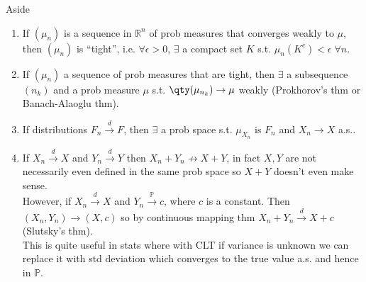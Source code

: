 \begin{aside}{Aside}
	\begin{enumerate}
		\item If $(\mu_n)$ is a sequence in $\mathbb{R}^n$ of prob measures that converges weakly to $\mu$, then $(\mu_n)$ is ``tight'', i.e. $\forall \epsilon > 0$, $\exists$ a compact set $K$ s.t. $\mu_n(K^c) < \epsilon \; \forall n$.
		\item If $(\mu_n)$ a sequence of prob measures that are tight, then $\exists$ a subsequence $(n_k)$ and a prob measure $\mu$ s.t. $\qty(\mu_{n_k}) \to \mu$ weakly (Prokhorov's  thm or Banach-Alaoglu thm).
		\item If distributions $F_n \xrightarrow{d} F$, then $\exists$ a prob space s.t. $\mu_{X_n}$ is $F_n$ and $X_n \to X$ a.s..
		\item If $X_n \xrightarrow{d} X$ and $Y_n \xrightarrow{d} Y$ then $X_n + Y_n \not\to X + Y$, in fact $X, Y$ are not necessarily even defined in the same prob space so $X + Y$ doesn't even make sense. \\
		However, if $X_n \xrightarrow{d} X$ and $Y_n \xrightarrow{\mathbb{P}} c$, where $c$ is a constant.
		Then $(X_n, Y_n) \to (X, c)$ so by continuous mapping thm $X_n + Y_n \xrightarrow{d} X + c$ (Slutsky's thm). \\
		This is quite useful in stats where with CLT if variance is unknown we can replace it with std deviation which converges to the true value a.s. and hence in $\mathbb{P}$.
	\end{enumerate}
\end{aside}